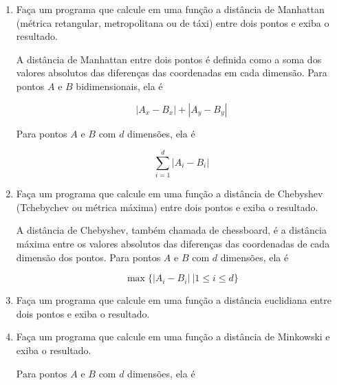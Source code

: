 \begin{enumerate}
	Desconsidere espaços e pontuação e considere letras maiúsculas e minúsculas iguais.
	
	São palíndromos: 
	
	\texttt{666}
	
	\texttt{101}
	
	\texttt{Ovo} 
	
	\texttt{Arara} 
	
	\texttt{Subi no onibus} 
	
	\texttt{Socorram-me, subi no onibus em Marrocos}
		 
	
	\item Faça um programa que calcule em uma função a distância de Manhattan (métrica retangular, metropolitana ou de táxi) entre dois pontos e exiba o resultado. 
	
	A distância de Manhattan entre dois pontos é definida como a soma dos valores absolutos das diferenças das coordenadas em cada dimensão.
	Para pontos $A$ e $B$ bidimensionais, ela é 
	
	\begin{equation*}
		|A_x - B_x| + |A_y - B_y|
	\end{equation*}	
	
	Para pontos $A$ e $B$ com $d$ dimensões, ela é
	
	\begin{equation*}
		\sum_{i=1}^d|A_i - B_i|
	\end{equation*}
	
	\item Faça um programa que calcule em uma função a distância de Chebyshev (Tchebychev ou métrica máxima) entre dois pontos e exiba o resultado.
	
	A distância de Chebyshev, também chamada de chessboard, é a distância máxima entre os valores absolutos das diferenças das coordenadas de cada dimensão dos pontos.
	Para pontos $A$ e $B$ com $d$ dimensões, ela é
	
	\begin{equation*}
		\max\{|A_i - B_i| \ | 1 \le i \le d \}
	\end{equation*}
	
	\item Faça um programa que calcule em uma função a distância euclidiana entre dois pontos e exiba o resultado. 

	\item Faça um programa que calcule em uma função a distância de Minkowski e exiba o resultado.
	
	Para pontos $A$ e $B$ com $d$ dimensões, ela é
	

\end{enumerate}
